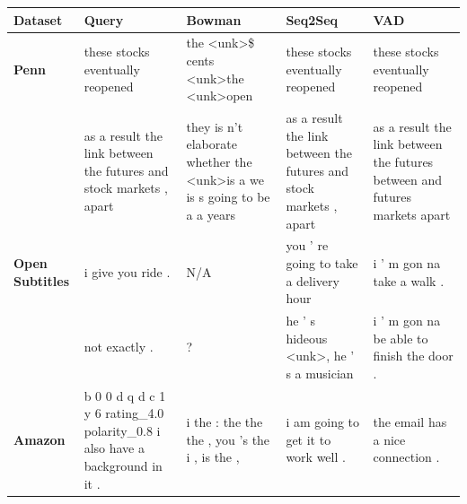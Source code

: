 \documentclass[12pt,twoside]{report}
\begin{document}
\begin{table}[!ht]
	\centering
	\footnotesize
	\begin{tabular}{|p{1.5cm}|p{2.8cm}|p{2.8cm}|p{2.8cm}|p{2.8cm}|}
		\hline
		\textbf{Dataset}       & \textbf{Query}                                                                                                                                & \textbf{Bowman}                                           & \textbf{Seq2Seq}                                                   & \textbf{VAD}                                                               \\ \hline
		\textbf{Penn}          & these stocks eventually reopened                                                                                                              & the  \textless{}unk\textgreater\space \$ cents \textless{}unk\textgreater\space the \textless{}unk\textgreater\space  open                   & these stocks eventually reopened                                   & these stocks eventually reopened                                           \\ \cline{2-5} 
													 & as a result the link between the futures and stock markets , apart                                                                            & they is n't elaborate whether the \textless{}unk\textgreater\space  is a we is s going to be a a years & as a result the link between the futures and stock markets , apart & as a result the link between the futures between and futures markets apart \\ \hline
		\textbf{Open Subtitles} & i give you ride .                                                                                                                             & N/A                                                       & you ' re going to take a delivery hour                             & i ' m gon na take a walk .                                                 \\ \cline{2-5} 
													 & not exactly .                                                                                                                                 & ?                                                         & he ' s hideous \textless{}unk\textgreater , he ' s a musician      & i ' m gon na be able to finish the door .                                  \\ \hline
		\textbf{Amazon}        & b 0 0 d q d c 1 y 6 rating\_4.0 polarity\_0.8 i also have a background in it .                                                                & i the : the the the , you 's the i , is the ,             & i am going to get it to work well .                                & the email has a nice connection .                                          \\ \cline{2-5} 

\end{tabular}
\end{table}
\end{document}
